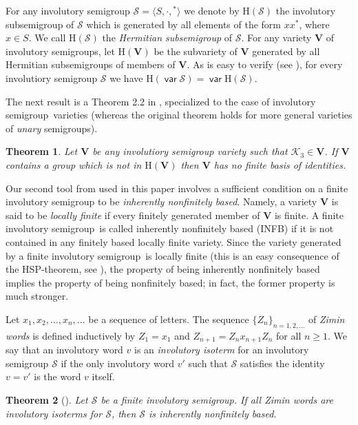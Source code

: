 \documentclass[preprint,1p,times]{elsarticle}
\DeclareMathOperator{\var}{\mathsf{var}}
\numberwithin{equation}{section}
\newtheorem{Thm}{Theorem}[section]
\theoremstyle{remark}
\def\cal{\mathcal}
\def\Sc{{\cal S}}
\def\Vc{\mathbf{V}}
\def\H{\mathrm H}
\def\sm{semi\-group}
\begin{document}
For any involutory semigroup $\mathcal{S}=\langle S,\cdot,{}^*\rangle$ we denote by $\H(\mathcal{S})$ the involutory
subsemigroup of $\mathcal{S}$ which is generated by all elements of the form $xx^*$, where $x\in S$. We call
$\H(\mathcal{S})$ the \emph{Hermitian subsemigroup} of $\mathcal{S}$. For any variety $\Vc$ of involutory semigroups,
let $\H(\Vc)$ be the subvariety of $\Vc$ generated by all Hermitian subsemigroups of members of $\Vc$. As is easy to
verify (see \cite[Lemma 2.1]{adv}), for every involutiory semigroup $\Sc$ we have $\H(\var\Sc)=\var\H(\Sc)$.

The next result is a Theorem 2.2 in \cite{adv}, specialized to the case of involutory \sm\ varieties (whereas the
original theorem holds for more general varieties of \emph{unary} semigroups).

\begin{Thm}\label{Theorem 2.1}
Let $\Vc$ be any involutiory semigroup variety such that $\mathcal{K}_3\in\Vc$. If  $\Vc$ contains a group which is not
in $\H(\Vc)$ then $\Vc$ has no finite basis of identities.
\end{Thm}

Our second tool from \cite{adv} used in this paper involves a sufficient condition on a finite involutory semigroup to
be \emph{inherently nonfinitely based}. Namely, a variety $\Vc$ is said to be \emph{locally finite} if every finitely
generated member of $\Vc$ is finite. A finite involutory \sm\ is called inherently nonfinitely based (INFB) if it is
not contained in any finitely based locally finite variety. Since the variety generated by a finite involutory \sm\ is
locally finite (this is an easy consequence of the HSP-theorem, see \cite[Theorem 10.16]{BuSa81}), the property of
being inherently nonfinitely based implies the property of being nonfinitely based; in fact, the former property is
much stronger.

Let $x_1,x_2,\dots,x_n,\dots$ be a sequence of letters. The sequence $\{Z_n\}_{n=1,2,\dots}$ of \emph{Zimin words} is
defined inductively by $Z_1=x_1$ and $Z_{n+1}=Z_nx_{n+1}Z_n$ for all $n\geq 1$. We say that an involutory word $v$ is
an \emph{involutory isoterm} for an involutory semigroup $\mathcal{S}$ if the only involutory word $v'$ such that
$\mathcal{S}$ satisfies the identity $v=v'$ is the word $v$ itself.

\begin{Thm}[\cite{adv}]\label{Theorem 2.2}
Let $\mathcal{S}$ be a finite involutory semigroup. If all Zimin words are involutory isoterms for
$\mathcal{S}$, then $\mathcal{S}$ is inherently nonfinitely based.
\end{Thm}
\end{document}
